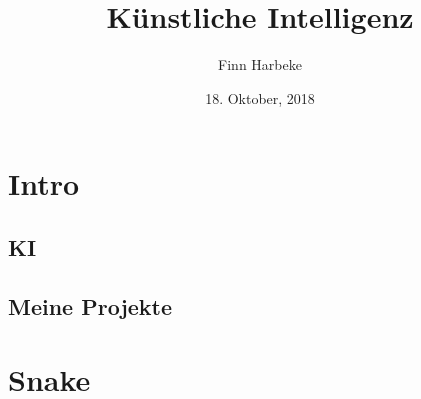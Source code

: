 \documentclass[10pt,a4paper,ngerman,english]{article}
\author{Finn Harbeke}
\title{Künstliche Intelligenz}
\date{18. Oktober, 2018}
\begin{document}
\setlength\parindent{0pt}

\maketitle
\tableofcontents
\pagebreak

\section{Intro}

\subsection{KI}

\subsection{Meine Projekte}

\section{Snake}
\end{document}
